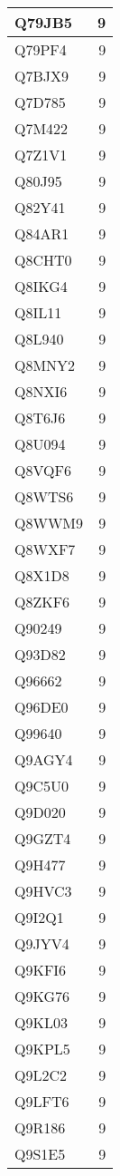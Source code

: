 \documentclass[
]{book}
\theoremstyle{definition}
\theoremstyle{definition}
\theoremstyle{definition}
\theoremstyle{definition}
\theoremstyle{remark}
\begin{document}
\begin{table}
\begin{tabular}{l|r}
\hline
Q79JB5 & 9\\
\hline
Q79PF4 & 9\\
\hline
Q7BJX9 & 9\\
\hline
Q7D785 & 9\\
\hline
Q7M422 & 9\\
\hline
Q7Z1V1 & 9\\
\hline
Q80J95 & 9\\
\hline
Q82Y41 & 9\\
\hline
Q84AR1 & 9\\
\hline
Q8CHT0 & 9\\
\hline
Q8IKG4 & 9\\
\hline
Q8IL11 & 9\\
\hline
Q8L940 & 9\\
\hline
Q8MNY2 & 9\\
\hline
Q8NXI6 & 9\\
\hline
Q8T6J6 & 9\\
\hline
Q8U094 & 9\\
\hline
Q8VQF6 & 9\\
\hline
Q8WTS6 & 9\\
\hline
Q8WWM9 & 9\\
\hline
Q8WXF7 & 9\\
\hline
Q8X1D8 & 9\\
\hline
Q8ZKF6 & 9\\
\hline
Q90249 & 9\\
\hline
Q93D82 & 9\\
\hline
Q96662 & 9\\
\hline
Q96DE0 & 9\\
\hline
Q99640 & 9\\
\hline
Q9AGY4 & 9\\
\hline
Q9C5U0 & 9\\
\hline
Q9D020 & 9\\
\hline
Q9GZT4 & 9\\
\hline
Q9H477 & 9\\
\hline
Q9HVC3 & 9\\
\hline
Q9I2Q1 & 9\\
\hline
Q9JYV4 & 9\\
\hline
Q9KFI6 & 9\\
\hline
Q9KG76 & 9\\
\hline
Q9KL03 & 9\\
\hline
Q9KPL5 & 9\\
\hline
Q9L2C2 & 9\\
\hline
Q9LFT6 & 9\\
\hline
Q9R186 & 9\\
\hline
Q9S1E5 & 9\\

\end{tabular}
\end{table}
\end{document}

